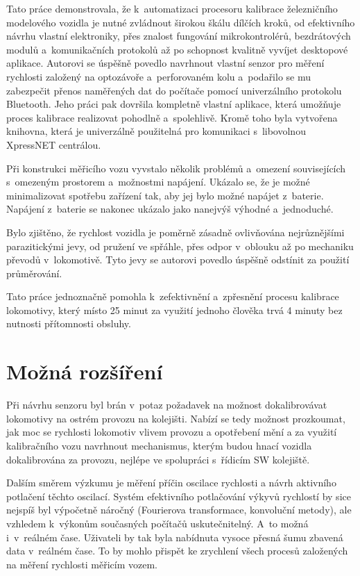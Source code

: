 Tato práce demonstrovala, že k~automatizaci procesoru kalibrace železničního
modelového vozidla je nutné zvládnout širokou škálu dílčích kroků, od
efektivního návrhu vlastní elektroniky, přes znalost fungování mikrokontrolérů,
bezdrátových modulů a~komunikačních protokolů až po schopnost kvalitně vyvíjet
desktopové aplikace. Autorovi se úspěšně povedlo navrhnout vlastní senzor pro
měření rychlosti založený na optozávoře a~perforovaném kolu a~podařilo se mu
zabezpečit přenos naměřených dat do počítače pomocí univerzálního protokolu
Bluetooth. Jeho práci pak dovršila kompletně vlastní aplikace, která umožňuje
proces kalibrace realizovat pohodlně a~spolehlivě. Kromě toho byla vytvořena
knihovna, která je univerzálně použitelná pro komunikaci s~libovolnou XpressNET
centrálou.

Při konstrukci měřicího vozu vyvstalo několik problémů a~omezení souvisejících
s~omezeným prostorem a~možnostmi napájení. Ukázalo se, že je možné minimalizovat
spotřebu zařízení tak, aby jej bylo možné napájet z~baterie. Napájení z~baterie
se nakonec ukázalo jako nanejvýš výhodné a~jednoduché.

Bylo zjištěno, že rychlost vozidla je poměrně zásadně ovlivňována nejrůznějšími
parazitickými jevy, od pružení ve spřáhle, přes odpor v~oblouku až po mechaniku
převodů v~lokomotivě. Tyto jevy se autorovi povedlo úspěšně odstínit za použití
průměrování.

Tato práce jednoznačně pomohla k~zefektivnění a~zpřesnění procesu kalibrace
lokomotivy, který místo 25 minut za využití jednoho člověka trvá 4 minuty
bez nutnosti přítomnosti obsluhy.

\section{Možná rozšíření}

Při návrhu senzoru byl brán v~potaz požadavek na možnost dokalibrovávat
lokomotivy na ostrém provozu na kolejišti. Nabízí se tedy možnost prozkoumat,
jak moc se rychlosti lokomotiv vlivem provozu a opotřebení mění a za využití
kalibračního vozu navrhnout mechanismus, kterým budou hnací vozidla
dokalibrována za provozu, nejlépe ve spolupráci s~řídicím SW kolejiště.

Dalším směrem výzkumu je měření příčin oscilace rychlosti a návrh
aktivního potlačení těchto oscilací. Systém efektivního potlačování výkyvů
rychlostí by sice nejspíš byl výpočetně náročný (Fourierova transformace,
konvoluční metody), ale vzhledem k~výkonům současných počítačů uskutečnitelný.
A~to možná i~v~reálném čase. Uživateli by tak byla nabídnuta vysoce přesná šumu
zbavená data v~reálném čase. To by mohlo přispět ke zrychlení všech procesů
založených na měření rychlosti měřicím vozem.
